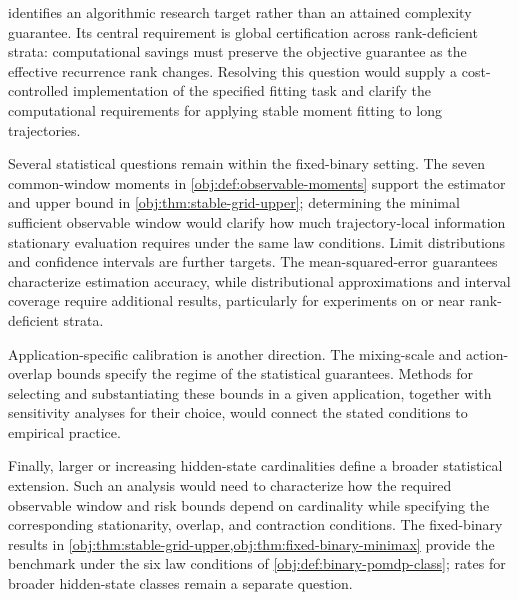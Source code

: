  identifies an algorithmic research target rather than an attained complexity guarantee. Its central requirement is global certification across rank-deficient strata: computational savings must preserve the objective guarantee as the effective recurrence rank changes. Resolving this question would supply a cost-controlled implementation of the specified fitting task and clarify the computational requirements for applying stable moment fitting to long trajectories.

Several statistical questions remain within the fixed-binary setting. The seven common-window moments in \cref{obj:def:observable-moments} support the estimator and upper bound in \cref{obj:thm:stable-grid-upper}; determining the minimal sufficient observable window would clarify how much trajectory-local information stationary evaluation requires under the same law conditions. Limit distributions and confidence intervals are further targets. The mean-squared-error guarantees characterize estimation accuracy, while distributional approximations and interval coverage require additional results, particularly for experiments on or near rank-deficient strata.

Application-specific calibration is another direction. The mixing-scale and action-overlap bounds specify the regime of the statistical guarantees. Methods for selecting and substantiating these bounds in a given application, together with sensitivity analyses for their choice, would connect the stated conditions to empirical practice.

Finally, larger or increasing hidden-state cardinalities define a broader statistical extension. Such an analysis would need to characterize how the required observable window and risk bounds depend on cardinality while specifying the corresponding stationarity, overlap, and contraction conditions. The fixed-binary results in \cref{obj:thm:stable-grid-upper,obj:thm:fixed-binary-minimax} provide the benchmark under the six law conditions of \cref{obj:def:binary-pomdp-class}; rates for broader hidden-state classes remain a separate question.
